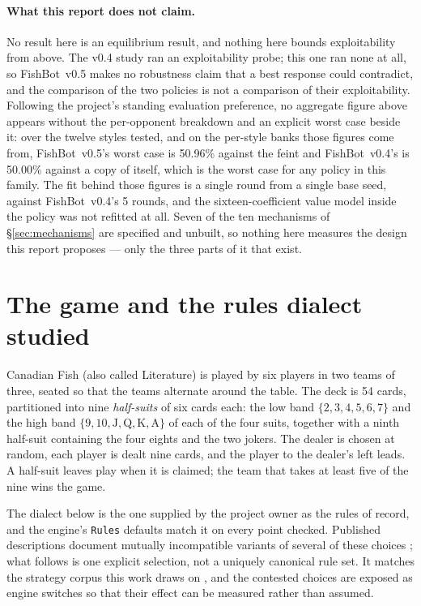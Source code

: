 \documentclass[11pt]{article}
\theoremstyle{definition}
\DeclareRobustCommand{\vfive}{\texorpdfstring{\mbox{FishBot v0.5}}{FishBot v0.5}}
\DeclareRobustCommand{\vfour}{\texorpdfstring{\mbox{FishBot v0.4}}{FishBot v0.4}}
\providecommand{\numVfourWorst}{50.00}
\providecommand{\numDecWorst}{50.96}
\providecommand{\numDecWorstOpp}{feint}
\providecommand{\numVfourFitRounds}{5}
\begin{document}
\paragraph{What this report does not claim.} No result here is an equilibrium
result, and nothing here bounds exploitability from above. The v0.4 study ran an
exploitability probe; this one ran none at all, so \vfive{} makes no robustness
claim that a best response could contradict, and the comparison of the two
policies is not a comparison of their exploitability. Following the project's
standing evaluation preference, no aggregate figure above appears without the
per-opponent breakdown and an explicit worst case beside it: over the twelve
styles tested, and on the per-style banks those figures come from, \vfive{}'s
worst case is \numDecWorst\% against the \numDecWorstOpp{} and \vfour{}'s is
\numVfourWorst\% against a copy of itself, which is the worst case for any
policy in this family. The fit behind those
figures is a single round from a single base seed, against \vfour{}'s
\numVfourFitRounds{} rounds, and the sixteen-coefficient value model inside the
policy was not refitted at all. Seven of the ten mechanisms of
\S\ref{sec:mechanisms} are specified and unbuilt, so nothing here measures the
design this report proposes --- only the three parts of it that exist.
\section{The game and the rules dialect studied}
\label{sec:rules}

Canadian Fish (also called Literature) is played by six players in two teams of
three, seated so that the teams alternate around the table. The deck is 54 cards,
partitioned into nine \emph{half-suits} of six cards each: the low band
$\{2,3,4,5,6,7\}$ and the high band
$\{9,10,\mathrm{J},\mathrm{Q},\mathrm{K},\mathrm{A}\}$ of each of the four suits,
together with a ninth half-suit containing the four eights and the two jokers.
The dealer is chosen at random, each player is dealt nine cards, and the player
to the dealer's left leads. A half-suit leaves play when it is claimed; the team
that takes at least five of the nine wins the game.

The dialect below is the one supplied by the project owner as the rules of
record, and the engine's \texttt{Rules} defaults match it on every point checked.
Published descriptions document mutually incompatible variants of several of
these choices \cite{pagat}; what follows is one explicit selection, not a
uniquely canonical rule set. It matches the strategy corpus this work draws on
\cite{develin}, and the contested choices are exposed as engine switches so that
their effect can be measured rather than assumed.
\end{document}
